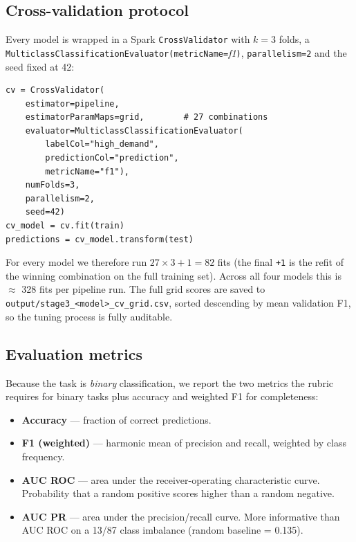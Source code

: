 \documentclass[11pt,a4paper]{article}
\begin{document}
\subsection{Cross-validation protocol}
Every model is wrapped in a Spark
\texttt{CrossValidator} with $k = 3$ folds, a
\texttt{MulticlassClassificationEvaluator(metricName=}\textit{f1}\texttt{)},
\texttt{parallelism=2} and the seed fixed at 42:

\begin{lstlisting}[style=python,caption={Cross-validated grid search
for one model.}]
cv = CrossValidator(
    estimator=pipeline,
    estimatorParamMaps=grid,        # 27 combinations
    evaluator=MulticlassClassificationEvaluator(
        labelCol="high_demand",
        predictionCol="prediction",
        metricName="f1"),
    numFolds=3,
    parallelism=2,
    seed=42)
cv_model = cv.fit(train)
predictions = cv_model.transform(test)
\end{lstlisting}

For every model we therefore run $27 \times 3 + 1 = 82$ fits (the
final \texttt{+1} is the refit of the winning combination on the full
training set).  Across all four models this is $\approx$ 328 fits per
pipeline run.  The full grid scores are saved to
\texttt{output/stage3\_<model>\_cv\_grid.csv}, sorted descending by
mean validation F1, so the tuning process is fully auditable.

\subsection{Evaluation metrics}
Because the task is \emph{binary} classification, we report the two
metrics the rubric requires for binary tasks plus accuracy and
weighted F1 for completeness:

\begin{itemize}[leftmargin=*]
  \item \textbf{Accuracy} --- fraction of correct predictions.
  \item \textbf{F1 (weighted)} --- harmonic mean of precision and
    recall, weighted by class frequency.
  \item \textbf{AUC ROC} --- area under the receiver-operating
    characteristic curve.  Probability that a random positive scores
    higher than a random negative.
  \item \textbf{AUC PR} --- area under the precision/recall curve.
    More informative than AUC ROC on a 13/87 class imbalance
    (random baseline = 0.135).
\end{itemize}
\end{document}
